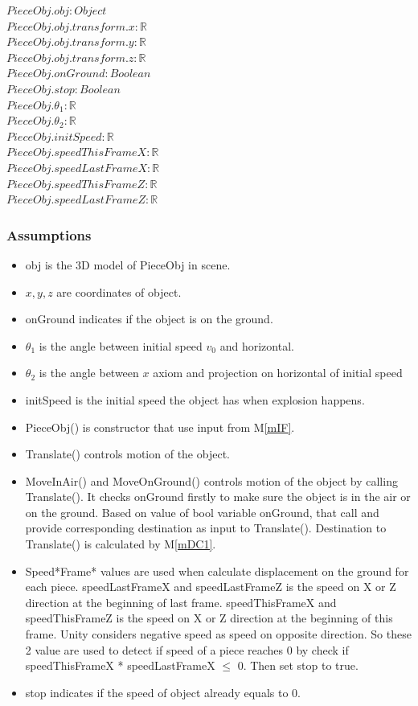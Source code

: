 \documentclass[12pt, titlepage]{article}
\newcommand{\mref}[1]{M\ref{#1}}
\begin{document}
$PieceObj.obj: Object$\\
$PieceObj.obj.transform.x: \mathbb{R}$\\
$PieceObj.obj.transform.y: \mathbb{R}$\\
$PieceObj.obj.transform.z: \mathbb{R}$\\
$PieceObj.onGround: Boolean$\\
$PieceObj.stop: Boolean$\\
$PieceObj.\theta_{1}: \mathbb{R}$\\
$PieceObj.\theta_{2}: \mathbb{R}$\\
$PieceObj.initSpeed: \mathbb{R}$\\
$PieceObj.speedThisFrameX: \mathbb{R}$\\
$PieceObj.speedLastFrameX: \mathbb{R}$\\
$PieceObj.speedThisFrameZ: \mathbb{R}$\\
$PieceObj.speedLastFrameZ: \mathbb{R}$

\subsubsection{Assumptions}

\noindent
\begin{itemize}
	\item obj is the 3D model of PieceObj in scene. 	
	\item $x,y,z$ are coordinates of object.	
	\item onGround indicates if the object is on the ground.	 
	\item $\theta_{1}$ is the angle between initial speed $v_{0}$ and horizontal.
	\item $\theta_{2}$ is the angle between $x$ axiom and projection on horizontal of initial speed
	\item initSpeed is the initial speed the object has when explosion happens.
	\item PieceObj() is constructor that use input from \mref{mIF}.
	\item Translate() controls motion of the object.
	\item  MoveInAir() and MoveOnGround() controls motion of the object by calling Translate(). It checks onGround firstly to make sure the object is in the air or on the ground. Based on value of bool variable onGround, that call and provide corresponding destination as input to Translate(). Destination to Translate() is calculated by \mref{mDC1}.
	\item Speed*Frame* values are used when calculate displacement on the ground for each piece. speedLastFrameX and speedLastFrameZ is the speed on X or Z direction at the beginning of last frame.
	speedThisFrameX and speedThisFrameZ is the speed on X or Z direction at the beginning of this frame. Unity considers negative speed as speed on opposite direction. So these 2 value are used to detect if speed of a piece reaches 0 by check if speedThisFrameX * speedLastFrameX $\leq$ 0. Then set stop to true.
	\item stop indicates if the speed of object already equals to 0.
\end{itemize}
\end{document}
